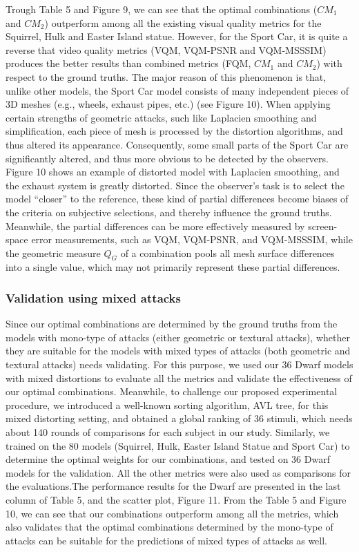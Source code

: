 Trough Table 5 and Figure 9, we can see that the optimal combinations ($CM_1$ and $CM_2$) outperform among all the existing visual quality metrics for the Squirrel, Hulk and Easter Island statue. However, for the Sport Car, it is quite a reverse that video quality metrics (VQM, VQM-PSNR and VQM-MSSSIM) produces the better results than combined metrics (FQM, $CM_1$ and $CM_2$) with respect to the ground truths. The major reason of this phenomenon is that, unlike other models, the Sport Car model consists of many independent pieces of 3D meshes (e.g., wheels, exhaust pipes, etc.) (see Figure 10). When applying certain strengths of geometric attacks, such like Laplacien smoothing and simplification, each piece of mesh is processed by the distortion algorithms, and thus altered its appearance. Consequently, some small parts of the Sport Car are significantly altered, and thus more obvious to be detected by the observers. Figure 10 shows an example of distorted model with Laplacien smoothing, and the exhaust system is greatly distorted. Since the observer’s task is to select the model “closer” to the reference, these kind of partial differences become biases of the criteria on subjective selections, and thereby influence the ground truths. Meanwhile, the partial differences can be more effectively measured by screen-space error measurements, such as VQM, VQM-PSNR, and VQM-MSSSIM, while the geometric measure $Q_G$ of a combination pools all mesh surface differences into a single value, which may not primarily represent these partial differences.\\
\subsubsection{Validation using mixed attacks}
Since our optimal combinations are determined by the ground truths from the models with mono-type of attacks (either geometric or textural attacks), whether they are suitable for the models with mixed types of attacks (both geometric and textural attacks) needs validating. For this purpose, we used our 36 Dwarf models with mixed distortions to evaluate all the metrics and validate the effectiveness of our optimal combinations. Meanwhile, to challenge our proposed experimental procedure, we introduced a well-known sorting algorithm, AVL tree, for this mixed distorting setting, and obtained a global ranking of 36 stimuli, which needs about 140 rounds of comparisons for each subject in our study. Similarly, we trained on the 80 models (Squirrel, Hulk, Easter Island Statue and Sport Car) to determine the optimal weights for our combinations, and tested on 36 Dwarf models for the validation. All the other metrics were also used as comparisons for the evaluations.The performance results for the Dwarf are presented in the last column of Table 5, and the scatter plot, Figure 11.
From the Table 5 and Figure 10, we can see that our combinations outperform among all the metrics, which also validates that the optimal combinations determined by the mono-type of attacks can be suitable for  the predictions of mixed types of attacks as well.\\

